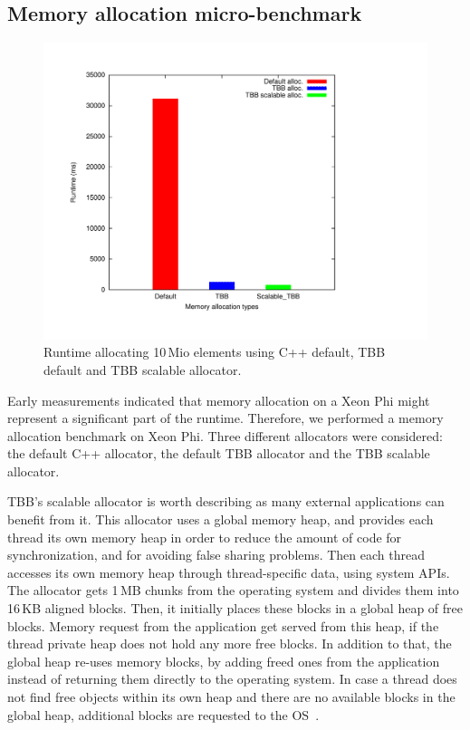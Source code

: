 \subsection{Memory allocation micro-benchmark}
\begin{figure}[t]
	\centering
	\includegraphics[scale=0.3]{../plots/mem_alloc/mem_alloc.pdf}
	\caption{Runtime allocating 10\,Mio elements using C++ default, TBB default and TBB scalable allocator.}
	\label{fig:mem_alloc}
\end{figure}

Early measurements indicated that memory allocation on a Xeon Phi might represent a significant part of the runtime.
Therefore, we performed a memory allocation benchmark on Xeon Phi.
Three different allocators were considered: the default C++ allocator, the default TBB allocator and the TBB scalable allocator. 

TBB's scalable allocator is worth describing as many external applications can benefit from it.
This allocator uses a global memory heap, and provides each thread its own memory heap in order to reduce the amount of code for synchronization, and for avoiding false sharing problems. Then each thread accesses its own memory heap through thread-specific data, using system APIs. The allocator gets 1\,MB chunks from the operating system and divides them into 16\,KB aligned blocks. Then, it initially places these blocks in a global heap of free blocks. Memory request from the application get served from this heap, if the thread private heap does not hold any more free blocks.
In addition to that, the global heap re-uses memory blocks, by adding freed ones from the application instead of returning them directly to the operating system.
In case a thread does not find free objects within its own heap and there are no available blocks in the global heap, additional blocks are requested to the OS~\cite{_thefoundations,Hudson:2006:MST:1133956.1133967}. 

